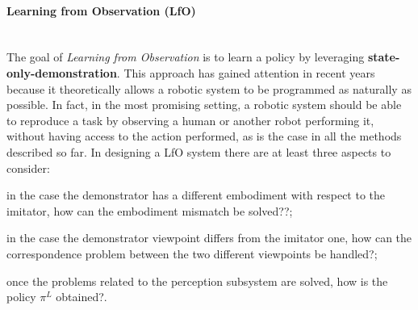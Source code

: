 \paragraph{Learning from Observation (LfO)} \mbox{} \\
\label{sec:lfo}
The goal of \textit{Learning from Observation} is to learn a policy by leveraging \textbf{state-only-demonstration}. This approach has gained attention in recent years because it theoretically allows a robotic system to be programmed as naturally as possible. In fact, in the most promising setting, a robotic system should be able to reproduce a task by observing a human or another robot performing it, without having access to the action performed, as is the case in all the methods described so far. In designing a LfO system there are at least three aspects to consider: \begin{enumerate*}[label=\textbf{(\arabic*)}]
    \item in the case the demonstrator has a different embodiment with respect to the imitator, how can the embodiment mismatch be solved??;
    \item in the case the demonstrator viewpoint differs from the imitator one, how can the correspondence problem between the two different viewpoints be handled?;
    \item once the problems related to the perception subsystem are solved, how is the policy $\pi^{L}$ obtained?. 
\end{enumerate*}


